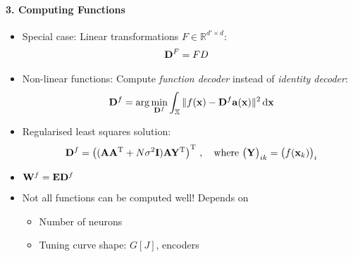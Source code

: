 \documentclass[10pt,letterpaper,oneside]{article}
\begin{document}
\paragraph{3. Computing Functions}

\begin{itemize}
	\item Special case: Linear transformations $F \in \mathbb{R}^{d' \times d}$:
	\begin{align*}
		{\mathbf{D}}^F &= F D
	\end{align*}
	\item Non-linear functions: Compute \emph{function decoder} instead of \emph{identity decoder}:
	\begin{align*}
		{\mathbf{D}}^f = \arg\min_{{\mathbf{D}}^f} \int_{\mathbb{X}} \| f({\mathbf{x}}) - {\mathbf{D}}^f {\mathbf{a}}({\mathbf{x}}) \|^2 \,\mathrm{d}{\mathbf{x}}
	\end{align*}
	\item Regularised least squares solution:
	\begin{align*}
		{\mathbf{D}}^f = \left( ({\mathbf{A}} {\mathbf{A}}^{\mathrm{T}} + N \sigma^2 {\mathbf{I}}) {\mathbf{A}} {\mathbf{Y}}^{\mathrm{T}} \right)^{\mathrm{T}} \,, \quad
		\text{where } \big ( {\mathbf{Y}} \big )_{ik} = \big( f({\mathbf{x}}_k) \big)_i 
	\end{align*}
	\item ${\mathbf{W}}^f = {\mathbf{E}} {\mathbf{D}}^f$
	\item Not all functions can be computed well! Depends on
	\begin{itemize}
		\item Number of neurons
		\item Tuning curve shape: $G[J]$, encoders
	\end{itemize}
\end{itemize}









\printbibliography
\end{document}
